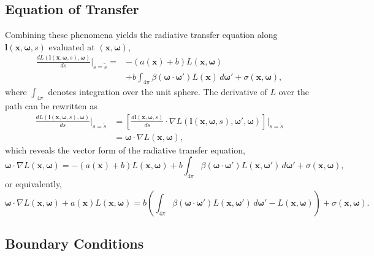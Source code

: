 \documentclass[ms,cpyr,lof,lot]{uathesis}
\renewcommand\vec\bm
\begin{document}
\subsection{Equation of Transfer}
Combining these phenomena yields the radiative transfer equation along
$\vec{l}(\vec{x}, \vec{\omega}, s)$ evaluated at $(\vec{x}, \vec{\omega})$,
\begin{align}
  \label{eqn:rte1d}
  \frac{dL\left(\vec{l}(\vec{x}, \vec{\omega}, s), \vec{\omega}\right)}{ds}\Bigg|_{s=\tilde{s}}
  = &-(a(\vec{x}) + b)L(\vec{x}, \vec{\omega}) \nonumber \\
  &+ b \int_{4\pi} \beta(\vec{\omega}\cdot\vec{\omega}') L(\vec{x})\, d\vec{\omega}' + \sigma(\vec{x}, \vec{\omega}),
\end{align}
where $\int_{4\pi}$ denotes integration over the unit sphere.
The derivative of $L$ over the path can be rewritten as
\begin{align*}
  \frac{dL\left(\vec{l}(\vec{x}, \vec{\omega}, s), \vec{\omega}\right)}{ds}\Bigg|_{s=\tilde{s}}
    &= \left[\frac{d\vec{l}(\vec{x}, \vec{\omega}, s)}{ds} \cdot \nabla L(\vec{l}(\vec{x}, \vec{\omega}, s), \vec{\omega}', \vec{\omega})\right]\Bigg|_{s=\tilde{s}} \\
    &= \vec{\omega} \cdot \nabla L(\vec{x}, \vec{\omega}),
\end{align*}
which reveals the vector form of the radiative transfer equation,
\begin{equation*}
  \vec{\omega} \cdot \nabla L(\vec{x}, \vec{\omega})
  = -(a(\vec{x}) + b)L(\vec{x}, \vec{\omega})
  + b \int_{4\pi} \beta(\vec{\omega}\cdot\vec{\omega}') L(\vec{x}, \vec{\omega}')\, d\vec{\omega}' + \sigma(\vec{x}, \vec{\omega}),
\end{equation*}
or equivalently,
\begin{equation}
  \vec{\omega} \cdot \nabla L(\vec{x}, \vec{\omega})
  + a(\vec{x})L(\vec{x}, \vec{\omega})
  = b \left(
    \int_{4\pi} \beta(\vec{\omega}\cdot\vec{\omega}') L(\vec{x}, \vec{\omega}')\, d\vec{\omega}'
    - L(\vec{x}, \vec{\omega})
  \right)+ \sigma(\vec{x}, \vec{\omega}).
  \label{eqn:rte}
\end{equation}

\subsection{Boundary Conditions}
\end{document}
